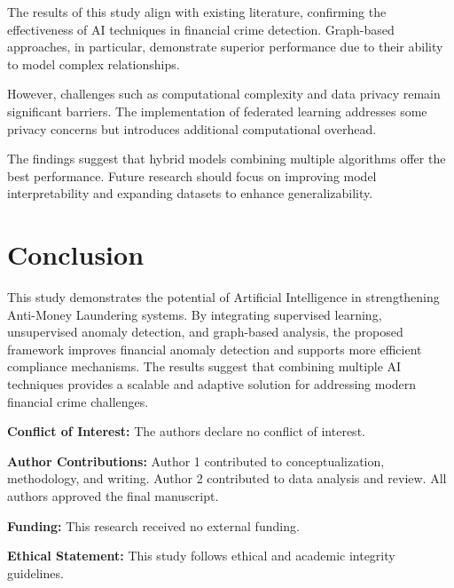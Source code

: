 \documentclass[twoside,twocolumn,10pt]{article}
\begin{document}
The results of this study align with existing literature, confirming the effectiveness of AI techniques in financial crime detection. Graph-based approaches, in particular, demonstrate superior performance due to their ability to model complex relationships.

However, challenges such as computational complexity and data privacy remain significant barriers. The implementation of federated learning addresses some privacy concerns but introduces additional computational overhead.

The findings suggest that hybrid models combining multiple algorithms offer the best performance. Future research should focus on improving model interpretability and expanding datasets to enhance generalizability.

\section{Conclusion}
\fontsize{11}{13}\selectfont

This study demonstrates the potential of Artificial Intelligence in strengthening Anti-Money Laundering systems. By integrating supervised learning, unsupervised anomaly detection, and graph-based analysis, the proposed framework improves financial anomaly detection and supports more efficient compliance mechanisms. The results suggest that combining multiple AI techniques provides a scalable and adaptive solution for addressing modern financial crime challenges.

\vspace{0.5cm}

\small
\textbf{Conflict of Interest:} The authors declare no conflict of interest.

\textbf{Author Contributions:} Author 1 contributed to conceptualization, methodology, and writing. Author 2 contributed to data analysis and review. All authors approved the final manuscript.

\textbf{Funding:} This research received no external funding.

\textbf{Ethical Statement:} This study follows ethical and academic integrity guidelines.

\balance
\fontsize{11}{13}\selectfont
\printbibliography
\end{document}
